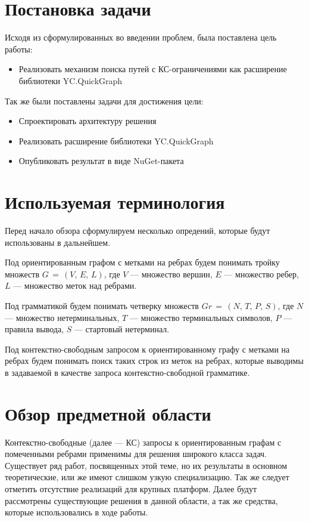 \documentclass[14pt]{matmex-diploma-custom}
\begin{document}
\section{Постановка задачи}
    Исходя из сформулированных во введении проблем, была поставлена цель работы:
	\begin{itemize}
	    \item Реализовать механизм поиска путей с КС-ограничениями как расширение библиотеки YC.QuickGraph
	\end{itemize}
	Так же были поставлены задачи для достижения цели:
	\begin{itemize}
	    \item Спроектировать архитектуру решения
        \item Реализовать расширение библиотеки YC.QuickGraph
        \item Опубликовать результат в виде NuGet-пакета
	\end{itemize}

\section{Используемая терминология}
    Перед начало обзора сформулируем несколько опредений, которые будут использованы в дальнейшем.
	
	Под ориентированным графом с метками на ребрах будем понимать тройку множеств \(G\,=\,(V,\,E,\,L)\), где \(V\) --- множество вершин, \(E\) --- множество ребер, \(L\) --- множество меток над ребрами.
	
	Под грамматикой будем понимать четверку множеств \(Gr\,=\,(N,\,T,\,P,\,S)\), где \(N\) --- множество нетерминальных, \(T\) --- множество терминальных символов, \(P\) --- правила вывода, \(S\) --- стартовый нетерминал.

	Под контекстно-свободным запросом к ориентированному графу с метками на ребрах будем понимать поиск таких строк из меток на ребрах, которые выводимы в задаваемой в качестве запроса контекстно-свободной грамматике.

\section{Обзор предметной области}
	Контекстно-свободные (далее --- КС) запросы к ориентированным графам с помеченными ребрами применимы для решения широкого класса задач. Существует ряд работ, посвященных этой теме, но их результаты в основном теоретические, или же имеют слишком узкую специализацию. Так же следует отметить отсутствие реализаций для крупных платформ. Далее будут рассмотрены существующие решения в данной области, а так же средства, которые использовались в ходе работы.
\end{document}

